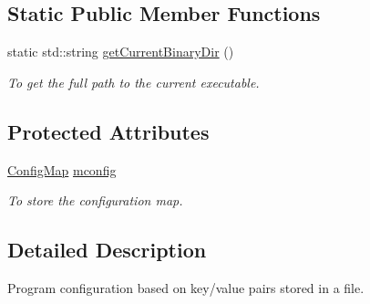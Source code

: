\subsection*{Static Public Member Functions}
\begin{DoxyCompactItemize}
\item 
\hypertarget{classExecConfiguration_a5b75f4ac72fdd73d570f019f131eca43}{
static std::string \hyperlink{classExecConfiguration_a5b75f4ac72fdd73d570f019f131eca43}{getCurrentBinaryDir} ()}
\label{classExecConfiguration_a5b75f4ac72fdd73d570f019f131eca43}

\begin{DoxyCompactList}\small\item\em To get the full path to the current executable. \item\end{DoxyCompactList}\end{DoxyCompactItemize}
\subsection*{Protected Attributes}
\begin{DoxyCompactItemize}
\item 
\hypertarget{classExecConfiguration_aa09f42121a169812bfe051606a94ae8c}{
\hyperlink{CommonParser_8hpp_a807e1daad5bfd9469080d93211df5dc1}{ConfigMap} \hyperlink{classExecConfiguration_aa09f42121a169812bfe051606a94ae8c}{mconfig}}
\label{classExecConfiguration_aa09f42121a169812bfe051606a94ae8c}

\begin{DoxyCompactList}\small\item\em To store the configuration map. \item\end{DoxyCompactList}\end{DoxyCompactItemize}


\subsection{Detailed Description}
Program configuration based on key/value pairs stored in a file. 

